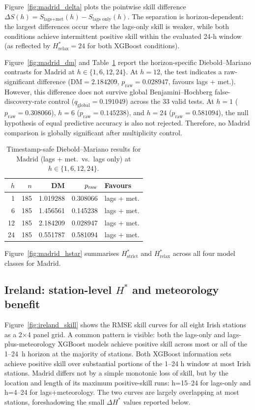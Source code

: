 \documentclass[12pt,a4paper]{article}
\begin{document}
Figure~\ref{fig:madrid_delta} plots the pointwise skill difference
$\Delta S(h) = S_{\text{lags+met}}(h) - S_{\text{lags only}}(h)$.  The
separation is horizon-dependent: the largest differences occur where the
lags-only skill is weaker, while both conditions achieve intermittent positive
skill within the evaluated 24-h window (as reflected by $H^*_{\text{relax}}=24$
for both XGBoost conditions).

Figure~\ref{fig:madrid_dm} and Table~\ref{tab:madrid_dm} report the
horizon-specific Diebold--Mariano contrasts for Madrid at
$h \in \{1, 6, 12, 24\}$.  At $h = 12$, the test indicates a raw-significant
difference ($\mathrm{DM} = 2.184209$, $p_{\text{raw}} = 0.028947$,
favours lags + met.).  However, this difference does not survive global
Benjamini--Hochberg false-discovery-rate control ($q_{\text{global}} = 0.191049$)
across the 33 valid tests.  At $h = 1$ ($p_{\text{raw}} = 0.308066$),
$h = 6$ ($p_{\text{raw}} = 0.145238$), and $h = 24$ ($p_{\text{raw}} = 0.581094$),
the null hypothesis of equal predictive accuracy is also not rejected.
Therefore, no Madrid comparison is globally significant after multiplicity control.

\begin{table}[htbp]
\centering
\caption{Timestamp-safe Diebold--Mariano results for Madrid (lags + met.\ vs.\
  lags only) at $h\in\{1,6,12,24\}$.}
\label{tab:madrid_dm}
\footnotesize
\begin{tabular}{rrrrl}
\toprule
$h$ & $n$ & DM & $p_{\rm raw}$ & Favours \\
\midrule
 1 & 185 & 1.019288 & 0.308066 & lags + met. \\
 6 & 185 & 1.456561 & 0.145238 & lags + met. \\
12 & 185 & 2.184209 & 0.028947 & lags + met. \\
24 & 185 & 0.551787 & 0.581094 & lags + met. \\
\bottomrule
\end{tabular}
\end{table}

Figure~\ref{fig:madrid_hstar} summarises $H^*_{\text{strict}}$ and
$H^*_{\text{relax}}$ across all four model classes for Madrid.

\subsection{Ireland: station-level $H^*$ and meteorology benefit}

Figure~\ref{fig:ireland_skill} shows the RMSE skill curves for all eight Irish
stations as a 2$\times$4 panel grid.  A common pattern is visible: both the
lags-only and lags-plus-meteorology XGBoost models achieve positive skill across
most or all of the 1--24~h horizon at the majority of stations. Both XGBoost information sets achieve positive skill over substantial portions of the 1–24 h window at most Irish stations. Madrid differs not by a simple monotonic loss of skill, but by the location and length of its maximum positive-skill runs: h=15–24 for lags-only and h=4–24 for lags+meteorology.
The two curves are largely overlapping at most stations, foreshadowing the small
$\Delta H^*$ values reported below.
\end{document}
